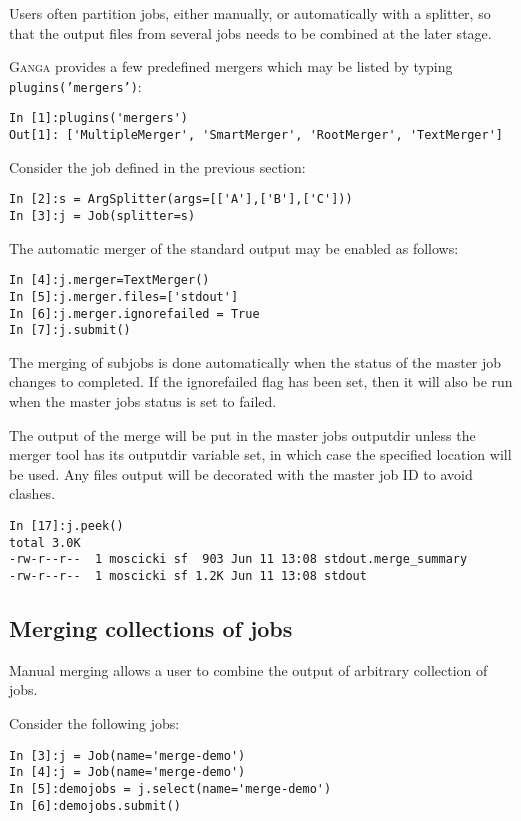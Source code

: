 \documentclass{howto}
\def\ganga {\textsc{Ganga}\xspace}
\begin{document}
Users often partition jobs, either manually, or automatically with a
splitter, so that the output files from several jobs needs to be
combined at the later stage.

\ganga provides a few predefined mergers which may be listed by typing \texttt{plugins('mergers')}:

\begin{verbatim}
In [1]:plugins('mergers')
Out[1]: ['MultipleMerger', 'SmartMerger', 'RootMerger', 'TextMerger']
\end{verbatim}

Consider the job defined in the previous section:

\begin{verbatim}
In [2]:s = ArgSplitter(args=[['A'],['B'],['C']))
In [3]:j = Job(splitter=s)
\end{verbatim}

The automatic merger of the standard output may be enabled as follows:

\begin{verbatim}
In [4]:j.merger=TextMerger()
In [5]:j.merger.files=['stdout']
In [6]:j.merger.ignorefailed = True
In [7]:j.submit()
\end{verbatim}

The merging of subjobs is done automatically when the status of the
master job changes to completed. If the ignorefailed flag has been
set, then it will also be run when the master jobs status is set to
failed.

The output of the merge will be put in the master jobs outputdir
unless the merger tool has its outputdir variable set, in which case
the specified location will be used. Any files output will be
decorated with the master job ID to avoid clashes.

\begin{verbatim}
In [17]:j.peek()
total 3.0K
-rw-r--r--  1 moscicki sf  903 Jun 11 13:08 stdout.merge_summary
-rw-r--r--  1 moscicki sf 1.2K Jun 11 13:08 stdout
\end{verbatim}

\subsection{Merging collections of jobs}

Manual merging allows a user to combine the output of arbitrary collection of jobs. 

Consider the following jobs:

\begin{verbatim}
In [3]:j = Job(name='merge-demo')
In [4]:j = Job(name='merge-demo')
In [5]:demojobs = j.select(name='merge-demo')
In [6]:demojobs.submit()
\end{verbatim}
\end{document}
